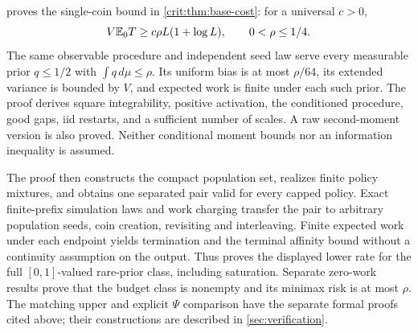  proves
the single-coin bound in \cref{crit:thm:base-cost}: for a universal $c>0$,
\[
 V\mathbb E_0T\ge c\rho L(1+\log L),\qquad 0<\rho\le1/4.
\]
The same observable procedure and independent seed law serve every
measurable prior $q\le1/2$ with $\int q\,d\mu\le\rho$. Its uniform
bias is at most $\rho/64$, its extended variance is bounded by $V$,
and expected work is finite under each such prior. The proof derives
square integrability, positive activation, the conditioned procedure,
good gaps, iid restarts, and a sufficient number of scales. A raw
second-moment version is also proved. Neither conditional moment
bounds nor an information inequality is assumed.

The proof then constructs the compact population set, realizes finite
policy mixtures, and obtains one separated pair valid for every capped
policy. Exact finite-prefix simulation laws and work charging transfer
the pair to arbitrary population seeds, coin creation, revisiting and
interleaving. Finite expected work under each endpoint yields termination
and the terminal affinity bound without a continuity assumption on the
output. Thus
proves the displayed lower rate for the full $[0,1]$-valued rare-prior
class, including saturation. Separate zero-work results prove that the
budget class is nonempty and its minimax risk is at most $\rho$.
The matching upper and explicit $\Psi$ comparison have the separate formal
proofs cited above; their constructions are described in \cref{sec:verification}.
